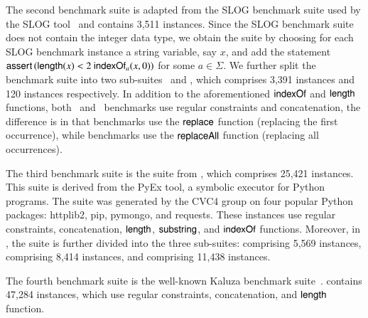 The second benchmark suite {\slogbench} is adapted from the SLOG benchmark suite used by the SLOG tool~\cite{fang-yu-circuits} and contains 3,511 instances. 
Since the SLOG benchmark suite does not contain the integer data type,
we obtain the {\slogbench} suite by choosing for each SLOG benchmark instance a string variable,
say $x$, and add the statement $\textsf{assert}\left(\mathsf{length}(x) < 2\ \mathsf{indexOf}_{a}(x, 0)\right)$ for some $a \in \Sigma$.
We further split the {\slogbench} benchmark suite into two sub-suites \slogbenchr\ and \slogbenchra, which comprises 3,391 instances and 120 instances respectively. In addition to the aforementioned $\mathsf{indexOf}$ and $\mathsf{length}$ functions, both  \slogbenchr\ and \slogbenchra\ benchmarks use regular constraints and concatenation, the difference is in that {\slogbenchr} benchmarks use the $\mathsf{replace}$ function (replacing the first occurrence), while {\slogbenchra} benchmarks use the $\mathsf{replaceAll}$ function (replacing all occurrences).


The third benchmark suite is the {\pyexbench} suite from \cite{ReynoldsWBBLT17}, which comprises 25,421 instances. 
This suite is derived from the PyEx tool, a symbolic executor for Python programs. The {\pyexbench} suite was generated by the CVC4 group on four popular Python packages: httplib2, pip, pymongo, and requests. These instances use regular constraints, concatenation, $\mathsf{length}$, $\mathsf{substring}$, and $\mathsf{indexOf}$ functions. Moreover, in  \cite{ReynoldsWBBLT17}, the {\pyexbench} suite is further divided into the three sub-suites: {\pyextdbench} comprising 5,569 instances, {\pyexztbench} comprising 8,414 instances, and {\pyexzzbench} comprising 11,438 instances.

The fourth benchmark suite {\kaluzabench} is the well-known Kaluza benchmark suite~\cite{Berkeley-JavaScript}.
{\kaluzabench} contains 47,284 instances, which use regular constraints, concatenation, and $\mathsf{length}$ function.





